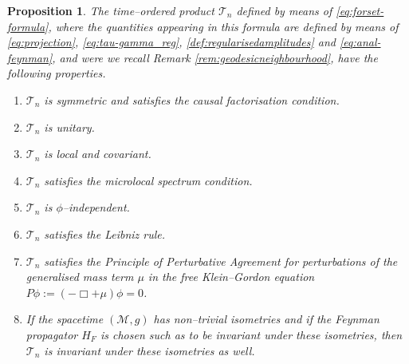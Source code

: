 \documentclass[a4paper,10pt,twoside]{article}
\numberwithin{equation}{section}
\newcounter{and}
\def\M{\mathcal{M}}
\theoremstyle{plain}
\newtheorem{propo}[theo]{Proposition}
\theoremstyle{definition}
\begin{document}
\begin{propo}\label{pr:propertiesscheme}
The time--ordered product $\mathcal{T}_n$ defined by means of \eqref{eq:forset-formula}, where the quantities appearing in this formula are defined by means of \eqref{eq:projection}, \eqref{eq:tau-gamma_reg}, \eqref{def:regularisedamplitudes} and \eqref{eq:anal-feynman}, and were we recall Remark \ref{rem:geodesicneighbourhood}, have the following properties.
\begin{enumerate}
\item $\mathcal{T}_n$ is symmetric and satisfies the causal factorisation condition.
\item $\mathcal{T}_n$ is unitary.
\item $\mathcal{T}_n$ is local and covariant.
\item $\mathcal{T}_n$ satisfies the microlocal spectrum condition.
\item $\mathcal{T}_n$ is $\phi$--independent.
\item $\mathcal{T}_n$ satisfies the Leibniz rule.
\item $\mathcal{T}_n$ satisfies the Principle of Perturbative Agreement for perturbations of the generalised mass term $\mu$ in the free Klein--Gordon equation $P\phi:=(-\Box + \mu)\phi=0$.
\item If the spacetime $(\M,g)$ has non--trivial isometries and if the Feynman propagator $H_F$ is chosen such as to be invariant under these isometries, then $\mathcal{T}_n$ is invariant under these isometries as well.
\end{enumerate}
\end{propo}
\end{document}
